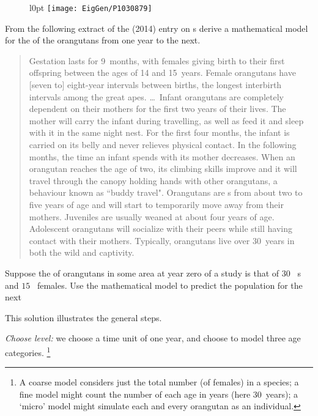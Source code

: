 \begin{figure}l{0pt}
\texttt{[image: EigGen/P1030879]}
\end{figure}
\begin{example}[orangutans] \label{eg:orang}
From the following  extract of the  (2014) entry on s \cite[]{CawthonLang2005} derive a mathematical model for the  of the orangutans from one year to the next.

\begin{quote}
Gestation lasts for 9~months, with females giving birth to their first offspring between the ages of 14 and 15~years. Female orangutans have [seven to] eight-year intervals between births, the longest interbirth intervals among the great apes. \ldots\  Infant orangutans are completely dependent on their mothers for the first two years of their lives. The mother will carry the infant during travelling, as well as feed it and sleep with it in the same night nest. For the first four months, the infant is carried on its belly and never relieves physical contact. In the following months, the time an infant spends with its mother decreases. When an orangutan reaches the age of two, its climbing skills improve and it will travel through the canopy holding hands with other orangutans, a behaviour known as ``buddy travel". Orangutans are s from about two to five years of age and will start to temporarily move away from their mothers.  Juveniles are usually weaned at about four years of age. Adolescent orangutans will socialize with their peers while still having contact with their mothers. Typically, orangutans live over 30~years in both the wild and captivity.
\end{quote}
Suppose the  of orangutans in some area at year zero of a study is that of \(30\)~ s and \(15\)~ females.
Use the mathematical model to predict the population for the next 

\begin{solution} This solution illustrates the general steps.

\emph{Choose level:}  we choose a time unit of one year, and choose to model three age categories.%
\footnote{A coarse model considers just the total number (of females) in a species; a fine model might count the number of each age in years (here 30~years); a `micro' model might simulate each and every orangutan as an individual.}


\end{solution}
\end{example}
